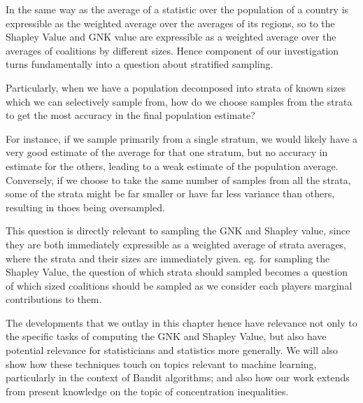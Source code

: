 In the same way as the average of a statistic over the population of a country is expressible as the weighted average over the averages of its regions, so to the Shapley Value and GNK value are expressible as a weighted average over the averages of coalitions by different sizes.
Hence component of our investigation turns fundamentally into a question about stratified sampling.

Particularly, when we have a population decomposed into strata of known sizes which we can selectively sample from, how do we choose samples from the strata to get the most accuracy in the final population estimate?


For instance, if we sample primarily from a single stratum, we would likely have a very good estimate of the average for that one stratum, but no accuracy in estimate for the others, leading to a weak estimate of the population average.
Conversely, if we choose to take the same number of samples from all the strata, some of the strata might be far smaller or have far less variance than others, resulting in thoes being oversampled.

This question is directly relevant to sampling the GNK and Shapley value, since they are both immediately expressible as a weighted average of strata averages, where the strata and their sizes are immediately given. eg. for sampling the Shapley Value, the question of which strata should sampled becomes a question of which sized coalitions should be sampled as we consider each players marginal contributions to them.

The developments that we outlay in this chapter hence have relevance not only to the specific tasks of computing the GNK and Shapley Value, but also have potential relevance for statisticians and statistics more generally.
We will also show how these techniques touch on topics relevant to machine learning, particularly in the context of Bandit algorithms; and also how our work extends from present knowledge on the topic of concentration inequalities.

